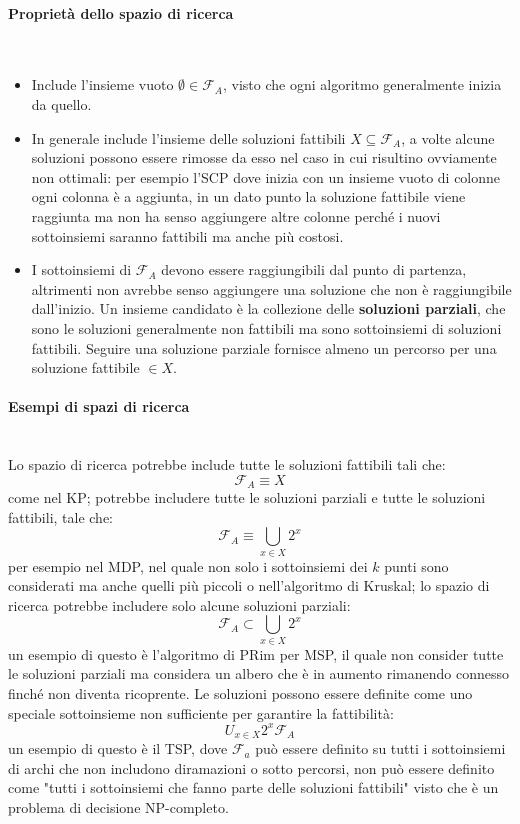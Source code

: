 \documentclass{article}
\begin{document}
\paragraph{Proprietà dello spazio di ricerca}\mbox{}\\
\begin{itemize}
    \item Include l'insieme vuoto $\emptyset\in\mathcal{F}_A$, visto che ogni algoritmo generalmente
          inizia da quello.

    \item In generale include l'insieme delle soluzioni fattibili $X\subseteq\mathcal{F}_A$, a volte
          alcune soluzioni possono essere rimosse da esso nel caso in cui risultino ovviamente non ottimali:
          per esempio l'SCP dove inizia con un insieme vuoto di colonne ogni colonna è a aggiunta, in un
          dato punto la soluzione fattibile viene raggiunta ma non ha senso aggiungere
          altre colonne perché i nuovi sottoinsiemi saranno fattibili ma anche più costosi.

    \item I sottoinsiemi di $\mathcal{F}_A$ devono essere raggiungibili dal punto di partenza,
          altrimenti non avrebbe senso aggiungere una soluzione che non è raggiungibile dall'inizio. Un
          insieme candidato è la collezione delle \textbf{soluzioni parziali}, che sono le soluzioni
          generalmente non fattibili ma sono sottoinsiemi di soluzioni fattibili. Seguire una soluzione
          parziale fornisce almeno un percorso per una soluzione fattibile $\in X$.

\end{itemize}
\paragraph{Esempi di spazi di ricerca}\mbox{}\\
Lo spazio di ricerca potrebbe include tutte le soluzioni fattibili tali che:
$$\mathcal{F}_A\equiv X$$
come nel KP; potrebbe includere tutte le soluzioni parziali e tutte le soluzioni fattibili, tale che:
$$\mathcal{F}_A\equiv \bigcup_{x\in X} 2^x$$
per esempio nel MDP, nel quale non solo i sottoinsiemi dei $k$ punti sono considerati ma anche
quelli più piccoli o nell'algoritmo di Kruskal; lo spazio di ricerca potrebbe includere solo
alcune soluzioni parziali:
$$\mathcal{F}_A\subset \bigcup_{x\in X} 2^x$$
un esempio di questo è l'algoritmo di PRim per MSP, il quale non consider tutte le soluzioni
parziali ma considera un albero che è in aumento rimanendo connesso finché non diventa ricoprente.
Le soluzioni possono essere definite come uno speciale sottoinsieme non sufficiente per garantire
la fattibilità:
$$ U_{x\in X}2^x \mathcal{F}_A$$
un esempio di questo è il TSP, dove $\mathcal{F}_a$ può essere definito su tutti i
sottoinsiemi di archi che non includono diramazioni o sotto percorsi, non può
essere definito come "tutti i sottoinsiemi che fanno parte delle soluzioni fattibili"
visto che è un problema di decisione NP-completo.
\end{document}
